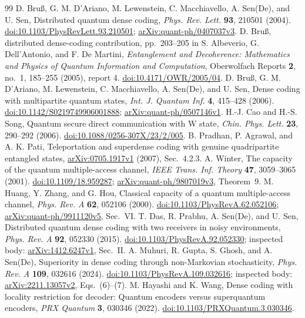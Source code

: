 \documentclass[11pt]{article}
\begin{document}
\begin{thebibliography}{99}
D. Bru\ss, G. M. D'Ariano, M. Lewenstein, C. Macchiavello, A. Sen(De), and U. Sen,
Distributed quantum dense coding, \emph{Phys. Rev. Lett.} \textbf{93}, 210501 (2004).
\href{https://doi.org/10.1103/PhysRevLett.93.210501}{doi:10.1103/PhysRevLett.93.210501};
\href{https://arxiv.org/abs/quant-ph/0407037v3}{arXiv:quant-ph/0407037v3}.
D. Bru\ss, distributed dense-coding contribution, pp.~203--205 in
S. Albeverio, G. Dell'Antonio, and F. De Martini,
\emph{Entanglement and Decoherence: Mathematics and Physics of Quantum
Information and Computation}, Oberwolfach Reports \textbf{2}, no.~1,
185--255 (2005), report 4.
\href{https://doi.org/10.4171/OWR/2005/04}{doi:10.4171/OWR/2005/04}.
D. Bru\ss, G. M. D'Ariano, M. Lewenstein, C. Macchiavello, A. Sen(De), and U. Sen,
Dense coding with multipartite quantum states,
\emph{Int. J. Quantum Inf.} \textbf{4}, 415--428 (2006).
\href{https://doi.org/10.1142/S0219749906001888}{doi:10.1142/S0219749906001888};
\href{https://arxiv.org/abs/quant-ph/0507146v1}{arXiv:quant-ph/0507146v1}.
H.-J. Cao and H.-S. Song, Quantum secure direct communication with W state,
\emph{Chin. Phys. Lett.} \textbf{23}, 290--292 (2006).
\href{https://doi.org/10.1088/0256-307X/23/2/005}{doi:10.1088/0256-307X/23/2/005}.
B. Pradhan, P. Agrawal, and A. K. Pati,
Teleportation and superdense coding with genuine quadripartite entangled states,
\href{https://arxiv.org/abs/0705.1917v1}{arXiv:0705.1917v1} (2007), Sec.~4.2.3.
A. Winter, The capacity of the quantum multiple-access channel,
\emph{IEEE Trans. Inf. Theory} \textbf{47}, 3059--3065 (2001).
\href{https://doi.org/10.1109/18.959287}{doi:10.1109/18.959287};
\href{https://arxiv.org/abs/quant-ph/9807019v3}{arXiv:quant-ph/9807019v3}, Theorem~9.
M. Huang, Y. Zhang, and G. Hou,
Classical capacity of a quantum multiple-access channel,
\emph{Phys. Rev. A} \textbf{62}, 052106 (2000).
\href{https://doi.org/10.1103/PhysRevA.62.052106}{doi:10.1103/PhysRevA.62.052106};
\href{https://arxiv.org/abs/quant-ph/9911120v5}{arXiv:quant-ph/9911120v5}, Sec.~VI.
T. Das, R. Prabhu, A. Sen(De), and U. Sen,
Distributed quantum dense coding with two receivers in noisy environments,
\emph{Phys. Rev. A} \textbf{92}, 052330 (2015).
\href{https://doi.org/10.1103/PhysRevA.92.052330}{doi:10.1103/PhysRevA.92.052330};
inspected body: \href{https://arxiv.org/abs/1412.6247v1}{arXiv:1412.6247v1}, Sec.~II.
A. Muhuri, R. Gupta, S. Ghosh, and A. Sen(De),
Superiority in dense coding through non-Markovian stochasticity,
\emph{Phys. Rev. A} \textbf{109}, 032616 (2024).
\href{https://doi.org/10.1103/PhysRevA.109.032616}{doi:10.1103/PhysRevA.109.032616};
inspected body: \href{https://arxiv.org/abs/2211.13057v2}{arXiv:2211.13057v2}, Eqs.~(6)--(7).
M. Hayashi and K. Wang, Dense coding with locality restriction for decoder:
Quantum encoders versus superquantum encoders,
\emph{PRX Quantum} \textbf{3}, 030346 (2022).
\href{https://doi.org/10.1103/PRXQuantum.3.030346}{doi:10.1103/PRXQuantum.3.030346}.
\end{thebibliography}
\end{document}
